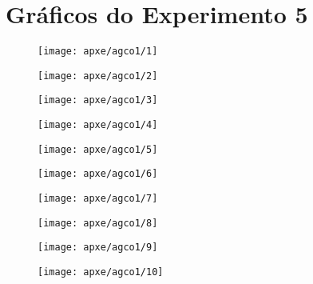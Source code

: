 \chapter{Gráficos do Experimento 5}

\begin{figure}[H]
\centering

\texttt{[image: apxe/agco1/1]}

\end{figure}

\begin{figure}[H]
\centering

\texttt{[image: apxe/agco1/2]}

\end{figure}

\begin{figure}[H]
\centering

\texttt{[image: apxe/agco1/3]}

\end{figure}
\begin{figure}[H]
\centering

\texttt{[image: apxe/agco1/4]}

\end{figure}
\begin{figure}[H]
\centering

\texttt{[image: apxe/agco1/5]}

\end{figure}
\begin{figure}[H]
\centering

\texttt{[image: apxe/agco1/6]}

\end{figure}
\begin{figure}[H]
\centering

\texttt{[image: apxe/agco1/7]}

\end{figure}
\begin{figure}[H]
\centering

\texttt{[image: apxe/agco1/8]}

\end{figure}
\begin{figure}[H]
\centering

\texttt{[image: apxe/agco1/9]}

\end{figure}
\begin{figure}[H]
\centering

\texttt{[image: apxe/agco1/10]}

\end{figure}


